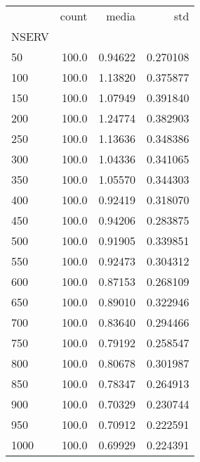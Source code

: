 \begin{tabular}{lrrr}
\toprule
{} &  count &    media &       std \\
NSERV &        &          &           \\
\midrule
50    &  100.0 &  0.94622 &  0.270108 \\
100   &  100.0 &  1.13820 &  0.375877 \\
150   &  100.0 &  1.07949 &  0.391840 \\
200   &  100.0 &  1.24774 &  0.382903 \\
250   &  100.0 &  1.13636 &  0.348386 \\
300   &  100.0 &  1.04336 &  0.341065 \\
350   &  100.0 &  1.05570 &  0.344303 \\
400   &  100.0 &  0.92419 &  0.318070 \\
450   &  100.0 &  0.94206 &  0.283875 \\
500   &  100.0 &  0.91905 &  0.339851 \\
550   &  100.0 &  0.92473 &  0.304312 \\
600   &  100.0 &  0.87153 &  0.268109 \\
650   &  100.0 &  0.89010 &  0.322946 \\
700   &  100.0 &  0.83640 &  0.294466 \\
750   &  100.0 &  0.79192 &  0.258547 \\
800   &  100.0 &  0.80678 &  0.301987 \\
850   &  100.0 &  0.78347 &  0.264913 \\
900   &  100.0 &  0.70329 &  0.230744 \\
950   &  100.0 &  0.70912 &  0.222591 \\
1000  &  100.0 &  0.69929 &  0.224391 \\
\bottomrule
\end{tabular}
